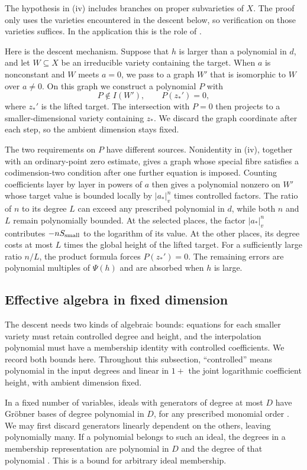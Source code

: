 The hypothesis in (iv) includes branches on proper subvarieties of $X$.
The proof only uses the varieties encountered in the descent below, so
verification on those varieties suffices.  In the application this is
the role of .

Here is the descent mechanism.  Suppose that $h$ is larger than a
polynomial in $d$, and let $W\subseteq X$ be an irreducible variety
containing the target.  When $a$ is nonconstant and $W$ meets $a=0$,
we pass to a graph $W'$ that is isomorphic to $W$ over $a\ne0$.
On this graph we construct a polynomial $P$ with
\[
 P\notin I(W'),\qquad P(z_*')=0,
\]
where $z_*'$ is the lifted target.  The intersection with $P=0$ then
projects to a smaller-dimensional variety containing $z_*$.  We discard
the graph coordinate after each step, so the ambient dimension stays
fixed.

The two requirements on $P$ have different sources.  Nonidentity in
(iv), together with an ordinary-point zero estimate, gives a graph whose
special fibre satisfies a codimension-two condition after one further
equation is imposed.  Counting coefficients layer by layer in powers of
$a$ then gives a polynomial nonzero on $W'$ whose target value is bounded
locally by $|a_*|_v^n$ times controlled factors.  The ratio of $n$ to its
degree $L$ can exceed any prescribed polynomial in $d$, while both $n$
and $L$ remain polynomially bounded.  At the selected places, the factor
$|a_*|_v^n$ contributes $-nS_{\rm small}$ to the logarithm of its value.
At the other places, its degree costs at most $L$ times the global height
of the lifted target.  For a sufficiently large ratio
$n/L$, the product formula forces $P(z_*')=0$.  The remaining errors
are polynomial multiples of $\Psi(h)$ and are absorbed when $h$ is large.

\subsection{Effective algebra in fixed dimension}

The descent needs two kinds of algebraic bounds: equations for each
smaller variety must retain controlled degree and height, and the
interpolation polynomial must have a membership identity with controlled
coefficients.  We record both bounds here.  Throughout this subsection,
``controlled'' means polynomial in the input degrees and linear in
$1+$ the joint logarithmic coefficient height, with ambient dimension
fixed.

In a fixed number of variables, ideals with generators of degree at most $D$ have
Gr\"obner bases of degree polynomial in $D$, for any prescribed monomial
order \cite[Corollary~8.3]{Dube1990}.  We may first discard generators
linearly dependent on the others, leaving polynomially many.  If a
polynomial belongs to such an
ideal, the degrees in a membership representation are polynomial in
$D$ and the degree of that polynomial
\cite[Theorem~3.4]{Aschenbrenner2004}.  This is a bound for arbitrary
ideal membership.

